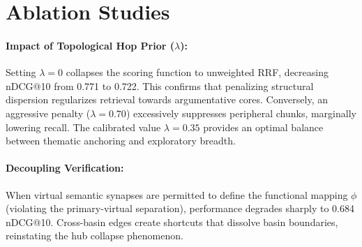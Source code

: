 \documentclass[10pt,twocolumn]{article}
\theoremstyle{definition}
\begin{document}
\section{Ablation Studies}

\begin{table}[t]
\centering
\caption{Ablation analysis on BEIR SciFact ($N=50$ test queries).}
\label{tab:ablations}
\end{table}

\paragraph{Impact of Topological Hop Prior ($\lambda$):}
Setting $\lambda = 0$ collapses the scoring function to unweighted RRF, decreasing nDCG@10 from 0.771 to 0.722. This confirms that penalizing structural dispersion regularizes retrieval towards argumentative cores. Conversely, an aggressive penalty ($\lambda = 0.70$) excessively suppresses peripheral chunks, marginally lowering recall. The calibrated value $\lambda = 0.35$ provides an optimal balance between thematic anchoring and exploratory breadth.

\paragraph{Decoupling Verification:}
When virtual semantic synapses are permitted to define the functional mapping $\phi$ (violating the primary-virtual separation), performance degrades sharply to 0.684 nDCG@10. Cross-basin edges create shortcuts that dissolve basin boundaries, reinstating the hub collapse phenomenon.
\end{document}

